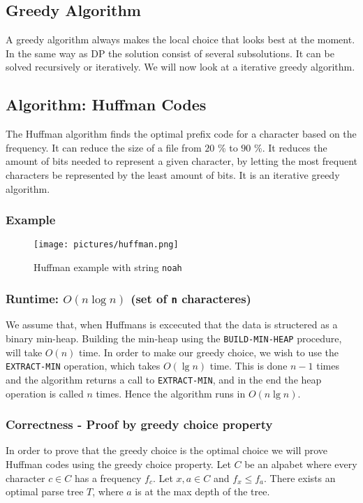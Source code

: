 \subsection*{Greedy Algorithm}
A greedy algorithm always makes the local choice that looks best at the moment.
In the same way as DP the solution consist of several subsolutions. It can be
solved recursively or iteratively. We will now look at a iterative greedy
algorithm.

\subsection*{Algorithm: Huffman Codes}
The Huffman algorithm finds the optimal prefix code for a character based on
the frequency. It can reduce the size of a file from $20$ \% to $90$ \%. It
reduces the amount of bits needed to represent a given character, by letting
the most frequent characters be represented by the least amount of bits. It is
an iterative greedy algorithm.
\subsubsection*{Example}
 \begin{figure}[H]
   \centering
   \texttt{[image: pictures/huffman.png]}
   \caption{Huffman example with string \texttt{noah}}
 \end{figure}
\subsubsection*{Runtime: $O(n\log n)$ (set of \texttt{n} characteres)}
We assume that, when Huffmans is excecuted that the data is structered as a
binary min-heap. Building the min-heap using the \texttt{BUILD-MIN-HEAP}
procedure, will take $O(n)$ time. In order to make our greedy choice, we wish
to use the \texttt{EXTRACT-MIN} operation, which takes $O(\lg n)$ time. This is
done $n-1$ times and the algorithm returns a call to \texttt{EXTRACT-MIN},
and in the end the heap operation is called $n$ times. Hence the algorithm runs
in $O(n\lg n)$.

\subsubsection*{Correctness - Proof by greedy choice property}
In order to prove that the greedy choice is the optimal choice we will prove
Huffman codes using the greedy choice property.
\newline\newline
Let $C$ be an alpabet where every character $c\in C$ has a frequency $f_c$. Let
$x,a\in C$ and $f_x\leq f_a$. There exists an optimal parse tree $T$, where $a$
is at the max depth of the tree.\newline\newline

